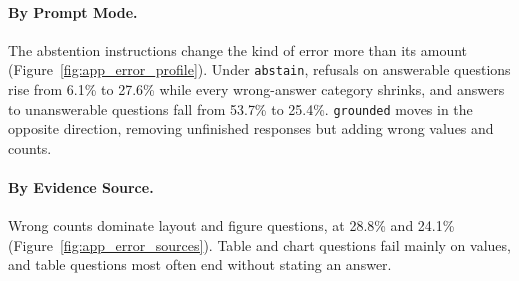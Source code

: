 \paragraph{By Prompt Mode.}
The abstention instructions change the kind of error more than its amount (Figure~\ref{fig:app_error_profile}). Under \texttt{abstain}, refusals on answerable questions rise from 6.1\% to 27.6\% while every wrong-answer category shrinks, and answers to unanswerable questions fall from 53.7\% to 25.4\%. \texttt{grounded} moves in the opposite direction, removing unfinished responses but adding wrong values and counts.

\paragraph{By Evidence Source.}
Wrong counts dominate layout and figure questions, at 28.8\% and 24.1\% (Figure~\ref{fig:app_error_sources}). Table and chart questions fail mainly on values, and table questions most often end without stating an answer.
